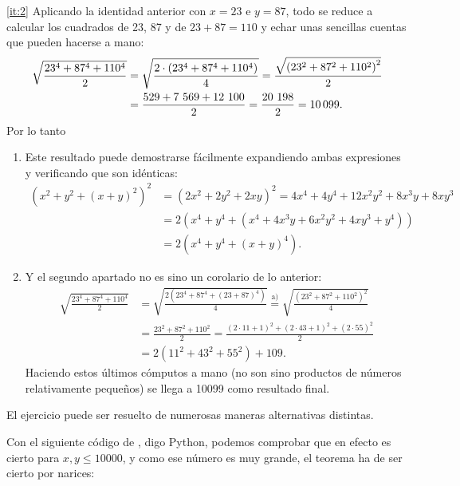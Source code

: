 \documentclass[
	fecha={5 de agosto de 2025},
	palabrasclave={RetoSecundaria, ago2025, álgebra, dif1},
	codigo=minted
]{RetoMatematico}
\begin{document}
\ref{it:2} Aplicando la identidad anterior con $x = 23$ e $y = 87$, todo se reduce a calcular los
cuadrados de 23, 87 y de $23 + 87 = 110$ y echar unas sencillas cuentas que pueden hacerse
a mano: \begin{align*}
	\sqrt{\frac{23^4+87^4+110^4}{2}} &= \sqrt{\frac{2\cdot\left(23^4+87^4+110^4\right)}{4}} = \frac{\sqrt{\left(23^2+87^2+110^2\right)^2}}{2}\\
	&= \frac{529 + 7\ 569 + 12\ 100}{2} = \frac{20\ 198}{2} = \num{10099}.
\end{align*} Por lo tanto 


\forma
\begin{enumerate}[label=\emph{\alph*})]
\item Este resultado puede demostrarse fácilmente expandiendo ambas expresiones y verificando que son idénticas: \begin{align*}
    \left(x^2 + y^2 + (x+y)^2\right)^2 &= \left(2x^2 + 2y^2 + 2xy\right)^2 = 4x^4 + 4y^4 + 12x^2y^2 + 8x^3y + 8xy^3\\
    &= 2(x^4 + y^4 + (x^4 + 4x^3 y + 6x^2y^2 + 4 xy^3 + y^4))\\
	&= 2(x^4 + y^4 + (x+y)^4).
\end{align*}
\item Y el segundo apartado no es sino un corolario de lo anterior: \begin{align*}
    \sqrt{\frac{23^4 + 87^4 + 110^4}{2}} &= \sqrt{\frac{2(23^4 + 87^4 + (23+87)^4)}{4}} \stackrel{\text{a)}}{=} \sqrt{\frac{\left(23^2 + 87^2 + 110^2\right)^2}{4}}\\
	&= \frac{23^2 + 87^2 + 110^2}{2} = \frac{(2\cdot 11 + 1)^2 + (2\cdot 43 + 1)^2 + (2\cdot 55)^2}{2}\\
	&= 2(11^2 + 43^2 + 55^2) + 109.
\end{align*} Haciendo estos últimos cómputos a mano (no son sino productos de números relativamente pequeños) se llega a 10099 como resultado final.
\end{enumerate}

\forma

El ejercicio puede ser resuelto de numerosas maneras alternativas distintas.

Con el siguiente código de \mathematica, digo Python, podemos comprobar que en efecto es cierto para $x,y\leq \num{10000}$, y como ese número es muy grande, el teorema ha de ser cierto por narices:
\end{document}
